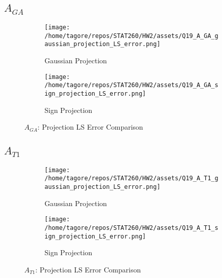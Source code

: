\documentclass{article}
\begin{document}
\subsection*{\(A_{GA}\)}
\begin{figure}[H]
    \centering
    \begin{subfigure}[b]{0.48\textwidth}
        \centering
        \texttt{[image: /home/tagore/repos/STAT260/HW2/assets/Q19\_A\_GA\_gaussian\_projection\_LS\_error.png]}
        \caption{Gaussian Projection}
        \label{fig:Q19_AGA_gaussian}
    \end{subfigure}
    \hfill
    \begin{subfigure}[b]{0.48\textwidth}
        \centering
        \texttt{[image: /home/tagore/repos/STAT260/HW2/assets/Q19\_A\_GA\_sign\_projection\_LS\_error.png]}
        \caption{Sign Projection}
        \label{fig:Q19_AGA_sign}
    \end{subfigure}
    \caption{\(A_{GA}\): Projection LS Error Comparison}
    \label{fig:Q19_AGA}
\end{figure}

\newpage
\subsection*{\(A_{T1}\)}
\begin{figure}[H]
    \centering
    \begin{subfigure}[b]{0.48\textwidth}
        \centering
        \texttt{[image: /home/tagore/repos/STAT260/HW2/assets/Q19\_A\_T1\_gaussian\_projection\_LS\_error.png]}
        \caption{Gaussian Projection}
        \label{fig:Q19_AT1_gaussian}
    \end{subfigure}
    \hfill
    \begin{subfigure}[b]{0.48\textwidth}
        \centering
        \texttt{[image: /home/tagore/repos/STAT260/HW2/assets/Q19\_A\_T1\_sign\_projection\_LS\_error.png]}
        \caption{Sign Projection}
        \label{fig:Q19_AT1_sign}
    \end{subfigure}
    \caption{\(A_{T1}\): Projection LS Error Comparison}
    \label{fig:Q19_AT1}
\end{figure}

\newpage
\end{document}
